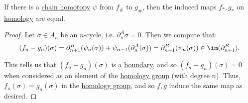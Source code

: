 \begin{theorem}\label{thm:chain-homotopies-on-homology}
	If there is a \hyperref[def:chain-homotopy]{chain homotopy} \(\psi\) from \(f_\#\) to \(g_\#\), then the induced maps
	\(f_\ast, g_\ast\) on \hyperref[def:homology-group]{homology} are equal.
\end{theorem}
\begin{proof}
	Let \(\sigma \in A_n\) be an \(n\)-cycle, i.e. \(\partial_n^A \sigma = 0\). Then we compute that:
	\[
		(f_n - g_n)(\sigma) = \partial_{n + 1}^B(\psi_n(\sigma)) + \psi_{n - 1}(\partial_n^A(\sigma)) = \partial_{n + 1}^B(\psi_n(\sigma)) \in \im (\partial^B_{n + 1}).
	\]

	This tells us that \((f_n - g_n)(\sigma)\) is a \hyperref[def:boundary]{boundary}, and so \((f_n - g_n)(\sigma) = 0\) when considered as an element of
	the \hyperref[def:homology-group]{homology group} (with degree \(n\)).
	Thus, \(f_n(\sigma) = g_n(\sigma)\) in the \hyperref[def:homology-group]{homology group}, and so \(f, g\) induce the same map as desired.
\end{proof}

\hr

